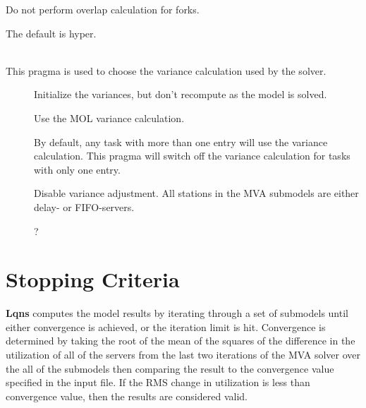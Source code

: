 \begin{description}
\begin{description}
Do not perform overlap calculation for forks.
\end{description}
The default is hyper.
\item[\optarg{variance}{=\emph{arg}}]~\\
This pragma is used to choose the variance calculation used by the solver.
\begin{description}
\item[]
Initialize the variances, but don't recompute as the model is solved.
\item[]
Use the MOL variance calculation.
\item[]
By default, any task with more than one entry will use the variance calculation.  This pragma will switch off the variance calculation for tasks with only one entry.
\item[]
Disable variance adjustment.  All stations in the MVA submodels are either delay- or FIFO-servers.
\item[]
?
\end{description}

\end{description}
\section{Stopping Criteria}
\label{sec:lqns-stopping-criteria}
\textbf{Lqns} computes the model results by iterating through a set of
submodels until either convergence is achieved, or the iteration limit
is hit. Convergence is determined by taking the root of the mean of
the squares of the difference in the utilization of all of the servers
from the last two iterations of the MVA solver over the all of the
submodels then comparing the result to the convergence value specified
in the input file. If the RMS change in utilization is less than
convergence value, then the results are considered valid.


